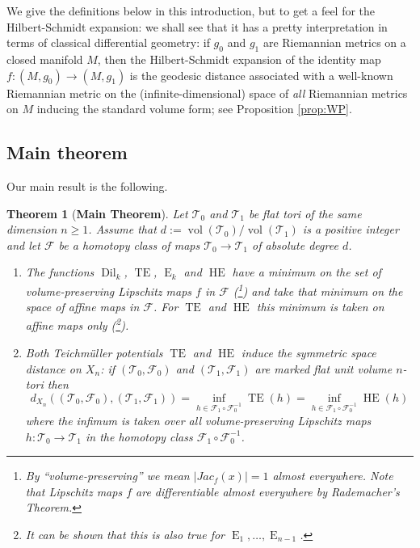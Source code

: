 \documentclass[11pt,letterpaper]{amsart}
\newtheorem{theorem}{Theorem}[section]
\theoremstyle{definition}
\numberwithin{equation}{section}
\theoremstyle{definition}
\newcommand{\Fc}{\mathcal{F}}
\newcommand{\Tc}{\mathcal{T}}
\DeclareMathOperator{\En}{E}
\DeclareMathOperator{\TE}{TE}
\DeclareMathOperator{\HE}{HE}
\newcommand{\Dil}{\operatorname{Dil}}
\newcommand{\vol}{\operatorname{vol}}
\begin{document}
We give the definitions  below in this introduction, but  to get a feel for the  Hilbert-Schmidt expansion: we shall see that it has a pretty interpretation in terms of classical differential geometry: if $g_0$ and $g_1$ are Riemannian metrics on a closed manifold $M$, then the Hilbert-Schmidt expansion of the identity map $f: (M, g_0)\to (M, g_1)$ is the geodesic distance associated with a 
well-known Riemannian metric  on the (infinite-dimensional) space of \emph{all} 
Riemannian metrics on $M$ inducing the standard volume form; see Proposition \ref{prop:WP}. 


\subsection{Main theorem} Our main result is the following.

\begin{theorem}[{\bf Main Theorem}]
\label{theorem:newmain}
Let $\Tc_0$ and $\Tc_1$ be flat tori  of the same dimension $n\ge 1$. 
 Assume  that $d:=\vol(\Tc_0)/\vol(\Tc_1)$ is a positive integer and let $\Fc$ be a homotopy class of maps $\Tc_0\to \Tc_1$ of absolute degree $d$.  
 \medskip
 
\begin{enumerate}
\item The functions  $\Dil_k$, $\TE$, $\En_k$ and $\HE$   have a minimum  on the set  of  \emph{volume-preserving} Lipschitz 
maps  $f$ in $\Fc$  (\footnote{By ``volume-preserving'' we mean $|Jac_f(x)|=1$ 
almost everywhere.  Note that Lipschitz maps $f$ are differentiable almost everywhere by Rademacher's Theorem.}) and take that  minimum on the space of affine maps  in $\Fc$. For $\TE$ and $\HE$ this minimum is taken on affine maps \emph{only} (\footnote{It can be shown that this is also true for  $\En_1, \dots, \En_{n-1}$.}).
\bigskip

\item[(2)] Both Teichm\"uller potentials $\TE$ and $\HE$  induce the symmetric space 
distance on $X_n$:  if  $(\Tc_0,\Fc_0)$ and $(\Tc_1,\Fc_1)$ are marked flat unit volume $n$-tori
then 
\begin{equation}\label{eqn:TEmin}
\textstyle d_{X_n}((\Tc_0,\Fc_0),(\Tc_1,\Fc_1))=\inf_{h\in \Fc_1\circ \Fc_0^{-1}}\TE(h)=\inf_{h\in \Fc_1\circ \Fc_0^{-1}}\HE(h)
\end{equation}
where the infimum is taken over all volume-preserving Lipschitz maps $h:\Tc_0\to \Tc_1$ in the homotopy class $\Fc_1\circ \Fc_0^{-1}$.
\end{enumerate}
\end{theorem}
\end{document}
